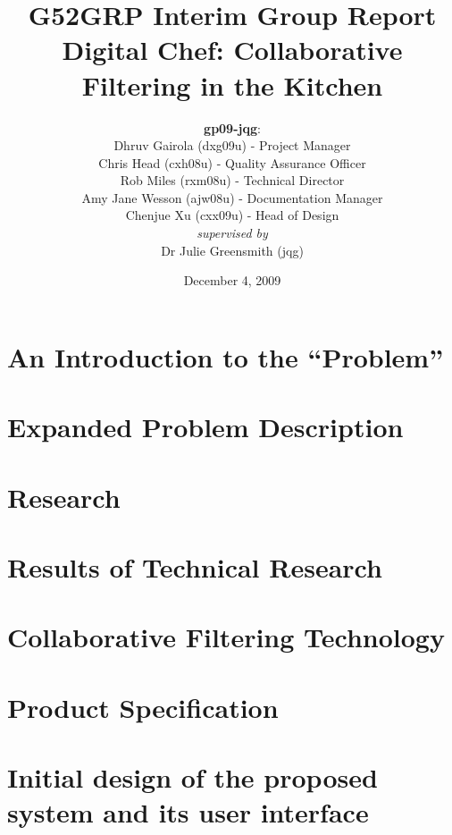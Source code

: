 \documentclass[12pt]{report}
\title{G52GRP Interim Group Report \vspace{0.5em}\\
Digital Chef: Collaborative Filtering in the Kitchen}                     %
\author{\textbf{gp09-jqg}: \\
\newline
Dhruv Gairola (dxg09u) - Project Manager\\
Chris Head (cxh08u) - Quality Assurance Officer\\
Rob Miles (rxm08u) - Technical Director\\
Amy Jane Wesson (ajw08u) - Documentation Manager\\
Chenjue Xu (cxx09u) - Head of Design\\
\textit{supervised by} \\
Dr Julie Greensmith (jqg)
} %
\date{December 4, 2009}                                    %
\begin{document}
\maketitle                                              %

\setlength{\topmargin}{-1.5in}
\tableofcontents
\setlength{\topmargin}{-.4in}

\vspace{10em}

\section{An Introduction to the ``Problem''}

\newpage

\section{Expanded Problem Description}

\newpage

\section{Research} %

\newpage

\section{Results of Technical Research}		%

\newpage

\section{Collaborative Filtering Technology}

\newpage

\section{Product Specification} 			%
\label{sec:productspec}

\newpage

\section{Initial design of the proposed system and its user interface}

\newpage
\end{document}

